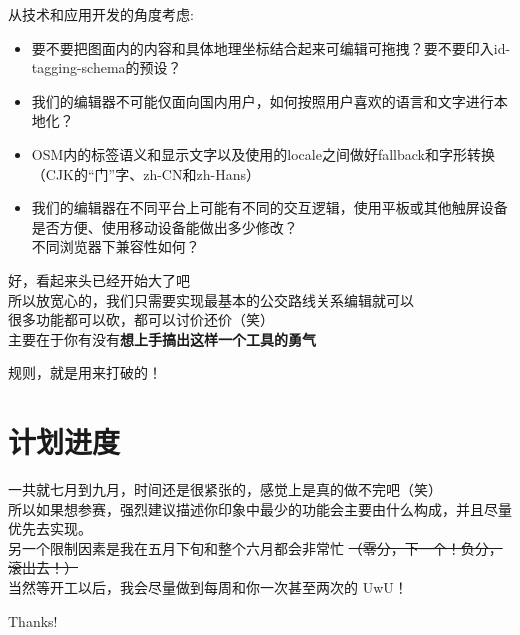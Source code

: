 \documentclass{beamer}
\begin{document}
\begin{frame}
    \Large
    从技术和应用开发的角度考虑: \\
    \normalsize
    \begin{itemize}
        \item 要不要把图面内的内容和具体地理坐标结合起来可编辑可拖拽？要不要印入id-tagging-schema的预设？
        \item 我们的编辑器不可能仅面向国内用户，如何按照用户喜欢的语言和文字进行本地化？
        \item OSM内的标签语义和显示文字以及使用的locale之间做好fallback和字形转换（CJK的“门”字、zh-CN和zh-Hans）
        \item 我们的编辑器在不同平台上可能有不同的交互逻辑，使用平板或其他触屏设备是否方便、使用移动设备能做出多少修改？\\
              不同浏览器下兼容性如何？
    \end{itemize}
\end{frame}

\begin{frame}
    \Large
    好，看起来头已经开始大了吧 \\
    \large
    \quad \quad 所以放宽心的，我们只需要实现最基本的公交路线关系编辑就可以 \\
    \quad \quad 很多功能都可以砍，都可以讨价还价（笑）\\
    \quad \quad 主要在于你有没有\textbf{想上手搞出这样一个工具的勇气}
\end{frame}

\begin{frame}
    \Huge
    规则，就是用来打破的！
\end{frame}

\section{计划进度}
\begin{frame}
    \quad \quad 一共就七月到九月，时间还是很紧张的，感觉上是真的做不完吧（笑） \\
    
    \quad \quad 所以如果想参赛，强烈建议描述你印象中最少的功能会主要由什么构成，并且尽量优先去实现。\\

    \quad \quad 另一个限制因素是我在五月下旬和整个六月都会非常忙
    \sout{（零分，下一个！负分，滚出去！）}\\

    \quad \quad 当然等开工以后，我会尽量做到每周和你一次甚至两次的 UwU！
\end{frame}

\begin{frame}
    \begin{center}
        {\Huge\calligra Thanks!}
    \end{center}
\end{frame}
\end{document}
